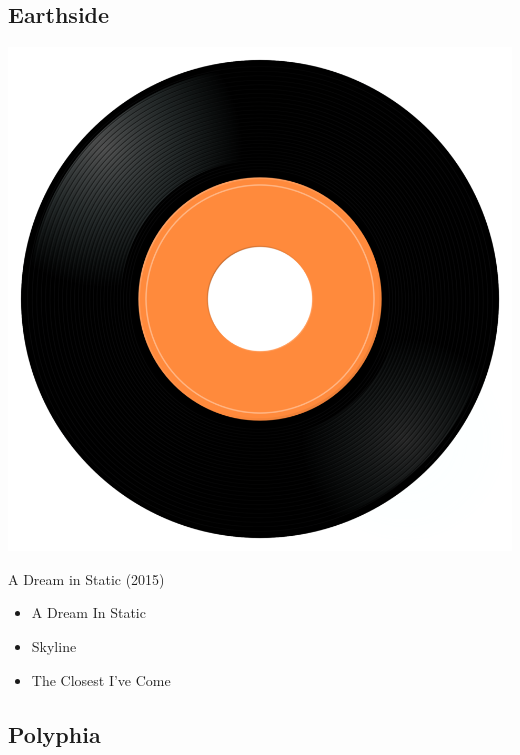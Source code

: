 \subsection{Earthside}

\begin{minipage}[t]{0.25\textwidth}
\captionsetup{type=figure}
\includegraphics[width=\textwidth]{Images/cover.png}
\caption*{A Dream in Static (2015)}
\end{minipage}
\begin{minipage}[t]{0.25\textwidth}\vspace{0pt}
\begin{itemize}[nosep,leftmargin=1em,labelwidth=*,align=left]
	\setlength{\itemsep}{0pt}
	\item A Dream In Static
	\item Skyline
	\item The Closest I've Come
\end{itemize}
\end{minipage}

\subsection{Polyphia}

